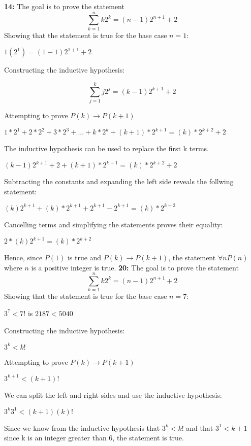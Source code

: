 \documentclass[12pt]{article}  %
\newcommand{\IMPLIES}{\rightarrow}
\begin{document}
\noindent
{\bf 14:}
The goal is to prove the statement \[ \sum_{k=1}^{n} k2^k = (n - 1)2^{n + 1} + 2 \]
Showing that the statement is true for the base case $n = 1$:
\begin{center}
      $1(2^1) = (1 - 1)2^{1 + 1} + 2$ 
\end{center}
Constructing the inductive hypothesis:
\begin{center}
      \[ \sum_{j=1}^{k} j2^j = (k - 1)2^{k + 1} + 2 \]
\end{center}
Attempting to prove $P(k) \IMPLIES P(k+1)$
\begin{center}
      $1*2^1 + 2*2^2 + 3*2^3 + ... + k*2^k + (k + 1) * 2^{k + 1} = (k)*2^{k + 2} + 2$
\end{center}
The inductive hypothesis can be used to replace the first k terms.
\begin{center}
      $(k - 1)2^{k + 1} + 2 + (k + 1) * 2^{k + 1} = (k)*2^{k + 2} + 2$
\end{center}
Subtracting the constants and expanding the left side reveals the follwing statement:
\begin{center}
      $(k)2^{k + 1} + (k) * 2^{k + 1} + 2^{k + 1} - 2^{k + 1}= (k)*2^{k + 2}$
\end{center}
Cancelling terms and simplifying the statements proves their equality:
\begin{center}
      $2*(k)2^{k + 1}= (k)*2^{k + 2}$
\end{center}
Hence, since $P(1)$ is true and $P(k) \IMPLIES P(k+1)$, the statement
$\forall n P(n)$ where $n$ is a positive integer is true. 
\noindent
{\bf 20:}
The goal is to prove the statement \[ \sum_{k=1}^{n} k2^k = (n - 1)2^{n + 1} + 2 \]
Showing that the statement is true for the base case $n = 7$:
\begin{center}
      $3^7 < 7!$ is $2187 < 5040$
\end{center}
Constructing the inductive hypothesis:
\begin{center}
      $3^k < k!$
\end{center}
Attempting to prove $P(k) \IMPLIES P(k + 1)$
\begin{center}
      $3^{k + 1} < (k + 1)!$
\end{center}
We can split the left and right sides and use the inductive hypothesis:
\begin{center}
      $3^k3^1 < (k + 1)(k)!$
\end{center}
Since we know from the inductive hypothesis that $3^k < k!$ and that
$3^1 < k + 1$ since k is an integer greater than 6, the statement is true.
\end{document}
